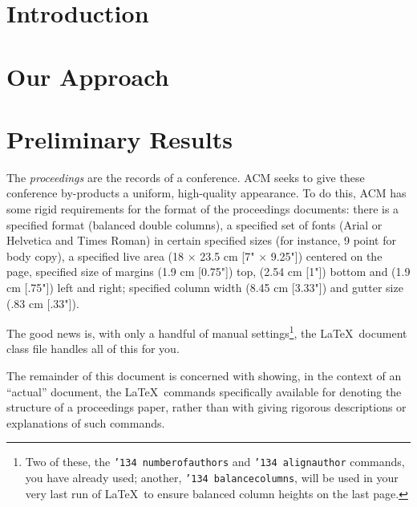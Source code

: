 \documentclass{sig-alternate-05-2015}
\begin{document}
%
%

%
%
\printccsdesc



\section{Introduction}


% 

\section{Our Approach}


\section{Preliminary Results}


The \textit{proceedings} are the records of a conference.
ACM seeks to give these conference by-products a uniform,
high-quality appearance.  To do this, ACM has some rigid
requirements for the format of the proceedings documents: there
is a specified format (balanced  double columns), a specified
set of fonts (Arial or Helvetica and Times Roman) in
certain specified sizes (for instance, 9 point for body copy),
a specified live area (18 $\times$ 23.5 cm [7" $\times$ 9.25"]) centered on
the page, specified size of margins (1.9 cm [0.75"]) top, (2.54 cm [1"]) bottom
and (1.9 cm [.75"]) left and right; specified column width
(8.45 cm [3.33"]) and gutter size (.83 cm [.33"]).

The good news is, with only a handful of manual
settings\footnote{Two of these, the {\texttt{\char'134 numberofauthors}}
and {\texttt{\char'134 alignauthor}} commands, you have
already used; another, {\texttt{\char'134 balancecolumns}}, will
be used in your very last run of \LaTeX\ to ensure
balanced column heights on the last page.}, the \LaTeX\ document
class file handles all of this for you.

The remainder of this document is concerned with showing, in
the context of an ``actual'' document, the \LaTeX\ commands
specifically available for denoting the structure of a
proceedings paper, rather than with giving rigorous descriptions
or explanations of such commands.
\end{document}
